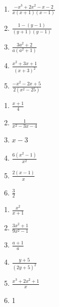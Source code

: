 \begin{description}
\begin{enumerate}[label=\thesection.5.\arabic*]
\begin{multicols}{3}
\begin{enumerate}[label=\alph*)]
                \item $\frac{-x^3+2x^2-x-2}{x(x+1)(x-1)}$
                
                \item $\frac{1-(y-1)}{(y+1)(y-1)}$
                
                \item $\frac{3a^2+2}{a(a^2+1)}$
                
                \item $\frac{x^2+3x+1}{(x+3)^2}$
                
                \item $\frac{-x^2-2x+5}{2(x^2-25)}$
            \end{enumerate}
        \end{multicols}
        
        \ansitem{} \begin{multicols}{3}
            \begin{enumerate}[label=\alph*)]
                \item $\frac{x+1}{4}$
                
                \item $\frac{1}{x^2-3x-4}$
                
                \item $x-3$
                
                \item $\frac{6(x^2-1)}{x^2}$
                
                \item $\frac{2(x-1)}{x}$
                
                \item $\frac{3}{2}$
            \end{enumerate}
        \end{multicols}
        
        \ansitem{} \begin{multicols}{3}
            \begin{enumerate}[label=\alph*)]
                \item $\frac{x^2}{x+1}$
                
                \item $\frac{3x^2+1}{9x^2-1}$
                
                \item $\frac{a+1}{a}$
                
                \item $\frac{y+5}{(2y+5)^2}$
                
                \item $\frac{x^3+2x^2+1}{x}$
                
                \item 1
            \end{enumerate}
        \end{multicols}
    \end{enumerate}
\end{description}